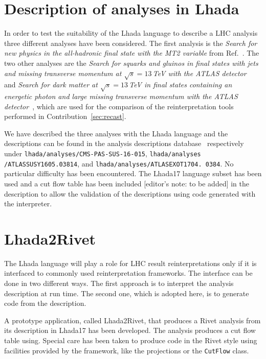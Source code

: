 \documentclass[11pt]{cernrep}
\begin{document}
\section{Description of analyses in {\sc Lhada}}

In order to test the suitability of the {\sc Lhada} language to describe a LHC analysis three different analyses have been considered. The first analysis is the {\em Search for new physics in the all-hadronic final state with the MT2 variable} from Ref.~\cite{CMS:2016xva}. The two other analyses are the {\em Search for squarks and gluinos in final states with jets and missing transverse momentum at $\sqrt{s} = 13\,$TeV  with the ATLAS detector}~\cite{Aaboud:2016zdn} and {\em Search for dark matter at $\sqrt{s}=13\,$TeV in final states containing an energetic photon and large missing transverse momentum with the ATLAS detector}~\cite{Aaboud:2017dor}, which are used for the comparison of the reinterpretation tools performed in Contribution~\ref{sec:recast}.

We have described the three analyses with the {\sc Lhada} language and the descriptions can be found in the analysis descriptions database~\cite{bib:lhada_git} respectively under {\tt lhada/analyses/CMS-PAS-SUS-16-015}, {\tt lhada/analyses /ATLASSUSY1605.03814}, and {\tt lhada/analyses/ATLASEXOT1704. 0384}. No particular difficulty has been encountered. The {\sc Lhada17} language subset has been used and a cut flow table has been included [editor's note: to be added] in the description to allow the validation of the descriptions using code generated with the interpreter.

\section{{\sc Lhada2Rivet}}

The {\sc Lhada} language will play a role for LHC result reinterpretations only if it is interfaced to commonly used reinterpretation frameworks. The interface can be done in two different ways. The first approach is to interpret the analysis description at run time. The second one, which is adopted here, is to generate code from the description.

A prototype application, called {\sc Lhada2Rivet}, that produces a {\sc Rivet} analysis from its description in {\sc Lhada17} has been developed. The analysis produces a cut flow table using. Special care has been taken to produce code in the {\sc Rivet} style using facilities provided by the framework, like the projections or the {\tt CutFlow} class.
\end{document}
